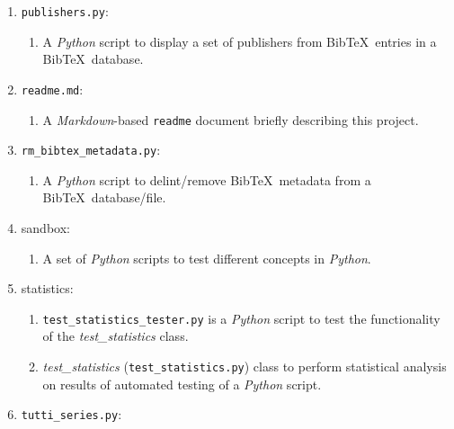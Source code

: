 \begin{enumerate}
	\begin{enumerate} \itemsep -2pt
	\item A {\it Python} script to display a set of organizations from {\sc Bib}\TeX\ entries in a {\sc Bib}\TeX\ database.
	\end{enumerate}
\item {\tt publishers.py}: \vspace{-0.3cm}
	\begin{enumerate} \itemsep -2pt
	\item A {\it Python} script to display a set of publishers from {\sc Bib}\TeX\ entries in a {\sc Bib}\TeX\ database.
	\end{enumerate}
\item {\tt readme.md}: \vspace{-0.3cm}
	\begin{enumerate} \itemsep -2pt
	\item A {\it Markdown}-based {\tt readme} document briefly describing this project.
	\end{enumerate}
\item {\tt rm\_bibtex\_metadata.py}: \vspace{-0.3cm}
	\begin{enumerate} \itemsep -2pt
	\item A {\it Python} script to delint/remove {\sc Bib}\TeX\ metadata from a {\sc Bib}\TeX\ database/file.
	\end{enumerate}
\item sandbox: \vspace{-0.3cm}
	\begin{enumerate} \itemsep -2pt
	\item A set of {\it Python} scripts to test different concepts in {\it Python}.
	\end{enumerate}
\item statistics: \vspace{-0.3cm}
	\begin{enumerate} \itemsep -2pt
	\item {\tt test\_statistics\_tester.py} is a {\it Python} script to test the functionality of the {\it test\_statistics} class.
	\item {\it test\_statistics} ({\tt test\_statistics.py}) class to perform statistical analysis on results of automated testing of a {\it Python} script.
	\end{enumerate}
\item {\tt tutti\_series.py}: \vspace{-0.3cm}
	\begin{enumerate} \itemsep -2pt

\end{enumerate}
\end{enumerate}
